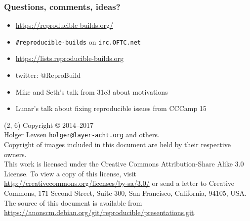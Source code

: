 \documentclass[14pt]{beamer}
\newif\ifplacelogo
\begin{document}
\placelogofalse

\begin{frame}
 \frametitle{Questions, comments, ideas?}

 \begin{itemize}
  \item \url{https://reproducible-builds.org/}
  \item \texttt{\#reproducible-builds} on \texttt{irc.OFTC.net}
  \item \url{https://lists.reproducible-builds.org}
  \item twitter: @ReproBuild
  \item<2> Mike and Seth's talk from 31c3 about motivations
  \item<2> Lunar's talk about fixing reproducible issues from CCCamp 15
  \end{itemize}
\end{frame}

\placelogotrue

\begin{frame}{}
\begin{textblock}{12}(2, 6)
    \tiny{
      Copyright \copyright{} 2014--2017 \\
         Holger Levsen \texttt{holger@layer-acht.org} and others.\\[3.0mm]
      Copyright of images included in this document are held by
      their respective owners.
      \\[3.0mm]
      This work is licensed under the \alert{Creative Commons
        Attribution-Share Alike 3.0} License.  To view a copy of this
      license, visit
      \url{http://creativecommons.org/licenses/by-sa/3.0/} or send a
      letter to Creative Commons, 171 Second Street, Suite 300, San
      Francisco, California, 94105, USA.
      \\[2.0mm]
      The source of this document is available from
      \url{https://anonscm.debian.org/git/reproducible/presentations.git}.
    }
  \end{textblock}
\end{frame}
\end{document}

